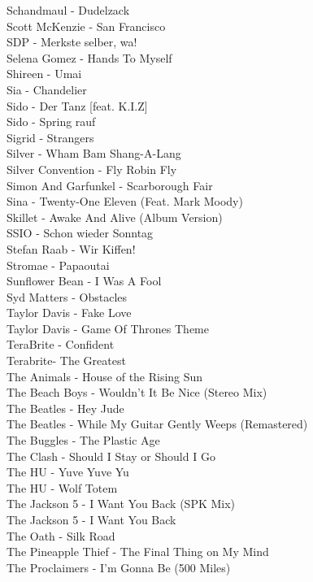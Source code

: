 Schandmaul - Dudelzack\\
Scott McKenzie - San Francisco\\
SDP - Merkste selber, wa!\\
Selena Gomez - Hands To Myself\\
Shireen - Umai\\
Sia - Chandelier\\
Sido - Der Tanz [feat. K.I.Z]\\
Sido - Spring rauf\\
Sigrid - Strangers\\
Silver - Wham Bam Shang-A-Lang\\
Silver Convention - Fly Robin Fly\\
Simon And Garfunkel - Scarborough Fair\\
Sina - Twenty-One Eleven (Feat. Mark Moody)\\
Skillet - Awake And Alive (Album Version)\\
SSIO - Schon wieder Sonntag\\
Stefan Raab - Wir Kiffen!\\
Stromae - Papaoutai\\
Sunflower Bean - I Was A Fool\\
Syd Matters - Obstacles\\
Taylor Davis - Fake Love\\
Taylor Davis - Game Of Thrones Theme\\
TeraBrite - Confident\\
Terabrite- The Greatest\\
The Animals - House of the Rising Sun\\
The Beach Boys - Wouldn't It Be Nice (Stereo Mix)\\
The Beatles - Hey Jude\\
The Beatles - While My Guitar Gently Weeps (Remastered)\\
The Buggles - The Plastic Age\\
The Clash - Should I Stay or Should I Go\\
The HU - Yuve Yuve Yu\\
The HU - Wolf Totem\\
The Jackson 5 - I Want You Back (SPK Mix)\\
The Jackson 5 - I Want You Back\\
The Oath - Silk Road\\
The Pineapple Thief - The Final Thing on My Mind\\
The Proclaimers - I'm Gonna Be (500 Miles)\\
